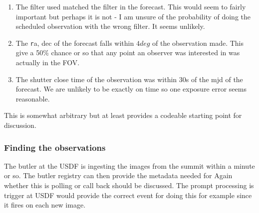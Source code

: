 \begin{enumerate}
\item The filter used matched the filter in the forecast.
This would seem to fairly important but perhaps it is not - I am unsure of the probability of
doing the scheduled observation with the wrong filter. It seems unlikely.
\item The {\texttt ra, dec} of the forecast falls within $4 deg$ of the observation made.
This give a 50\% chance or so that any point an observer was interested in was actually in the FOV.
\item The shutter close time of the observation was within 30s of the mjd of the forecast.
We are unlikely to be exactly on time so one exposure error seems reasonable.
\end{enumerate}

This is somewhat arbitrary but at least provides a codeable starting point for discussion.

\subsubsection{Finding the observations}
The butler at the USDF is ingesting the images from the summit within a minute or so.
The butler registry can then provide the metadata needed for  
Again whether this is polling or call back should be discussed.
The prompt processing is trigger at USDF would provide the correct event for doing this for example
since it fires on each new image.
